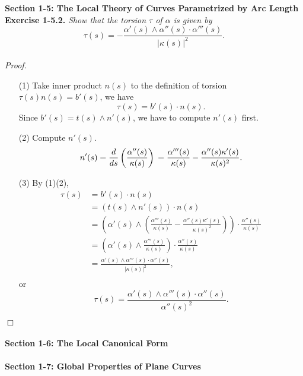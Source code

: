 \documentclass{article}
\begin{document}
\textbf{\large Section 1-5: The Local Theory of Curves Parametrized by Arc Length} \\

\textbf{Exercise 1-5.2.}
\emph{Show that the torsion $\tau$ of $\alpha$ is given by
$$\tau(s) = -\frac{\alpha'(s) \wedge \alpha''(s) \cdot \alpha'''(s)}{|\kappa(s)|^2}.$$} \\

\emph{Proof.}
\begin{enumerate}
\item[(1)]
Take inner product $n(s)$
to the definition of torsion $\tau(s) n(s) = b'(s)$,
we have $$\tau(s) = b'(s) \cdot n(s).$$
Since $b'(s) = t(s) \wedge n'(s)$, we have to compute $n'(s)$ first.
\item[(2)]
Compute $n'(s)$.
$$n'(s)
= \frac{d}{ds} \left( \frac{\alpha''(s)}{\kappa(s)} \right) \\
= \frac{\alpha'''(s)}{\kappa(s)} - \frac{\alpha''(s)\kappa'(s)}{\kappa(s)^2}.$$
\item[(3)]
By (1)(2),
\begin{align*}
\tau(s)
&= b'(s) \cdot n(s) \\
&= (t(s) \wedge n'(s)) \cdot n(s) \\
&= \left(
  \alpha'(s)
    \wedge
  \left(
    \frac{\alpha'''(s)}{\kappa(s)}
    - \frac{\alpha''(s)\kappa'(s)}{\kappa(s)^2}
  \right)
\right)
\cdot \frac{\alpha''(s)}{\kappa(s)} \\
&= \left(
  \alpha'(s) \wedge \frac{\alpha'''(s)}{\kappa(s)}
\right)
\cdot \frac{\alpha''(s)}{\kappa(s)} \\
&= \frac{\alpha'(s) \wedge \alpha'''(s) \cdot \alpha''(s)}{|\kappa(s)|^2}, \\
\end{align*}
or
$$\tau(s) = \frac{\alpha'(s) \wedge \alpha'''(s) \cdot \alpha''(s)}{\alpha''(s)^2}.$$

\end{enumerate}
$\Box$ \\\\






\textbf{\large Section 1-6: The Local Canonical Form} \\\\






\textbf{\large Section 1-7: Global Properties of Plane Curves} \\\\



\end{document}
